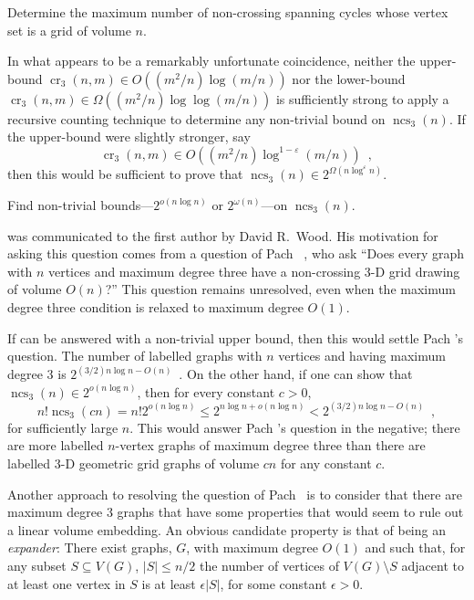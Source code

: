 \documentclass{patmorin}
\DeclareMathOperator{\crs}{cr}
\DeclareMathOperator{\ncs}{ncs}
\begin{document}
\begin{op}
  Determine the maximum number of non-crossing spanning cycles whose
  vertex set is a grid of volume $n$.
\end{op}

In what appears to be a remarkably unfortunate coincidence, neither the
upper-bound $\crs_3(n,m)\in O((m^2/n)\log (m/n))$ nor the lower-bound
$\crs_3(n,m)\in \Omega((m^2/n)\log\log(m/n))$ is sufficiently strong
to apply a recursive counting technique to determine any non-trivial
bound on $\ncs_3(n)$.  If the upper-bound were slightly stronger, say
\[
   \crs_3(n,m)\in O((m^2/n)\log^{1-\varepsilon}(m/n)) \enspace ,
\]
then this would be sufficient to prove that
$\ncs_3(n)\in2^{\Omega(n\log^{\varepsilon} n)}$.

\begin{op}
  Find non-trivial bounds---$2^{o(n\log n)}$ or $2^{\omega(n)}$---on
  $\ncs_3(n)$.
\end{op}

 was communicated to the first author by David R.\
Wood.  His motivation for asking this question comes from a question of
Pach \etal~\cite{pach.thiele.ea:three-dimensional}, who ask ``Does every
graph with $n$ vertices and maximum degree three have a non-crossing
3-D grid drawing of volume $O(n)$?''  This question remains unresolved,
even when the maximum degree three condition is relaxed to maximum
degree $O(1)$.

If  can be answered with a  non-trivial upper bound,
then this would settle Pach \etal's question.
The number of labelled graphs with $n$
vertices and having maximum degree $3$ is $2^{(3/2)n\log n -
O(n)}$~\cite[Appendix~A]{barat.matousek.ea:bounded-degree}. On the other
hand, if one can show that $\ncs_3(n)\in 2^{o(n\log n)}$, then for every
constant $c>0$,
\[
   n!\ncs_3(cn) = n!2^{o(n\log n)} \le 2^{n\log n + o(n\log n)}
   < 2^{(3/2)n\log n - O(n)} \enspace ,
\]
for sufficiently large $n$. This would answer Pach \etal's question in
the negative; there are more labelled $n$-vertex graphs of maximum degree
three than there are labelled 3-D geometric grid graphs of volume $cn$
for any constant $c$. 

Another approach to resolving the question of Pach \etal\ is to consider
that there are maximum degree 3 graphs that have some properties that
would seem to rule out a linear volume embedding.  An obvious candidate
property is that of being an \emph{expander}: There exist graphs, $G$,
with maximum degree $O(1)$ and such that, for any subset $S\subseteq
V(G)$, $|S|\le n/2$ the number of vertices of $V(G)\setminus S$ adjacent
to at least one vertex in $S$ is at least $\epsilon|S|$, for some constant
$\epsilon > 0$.
\end{document}
